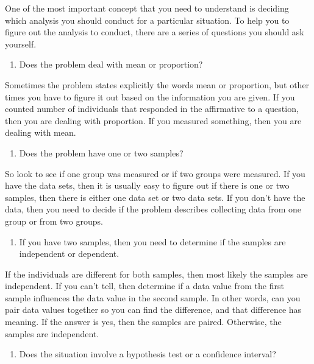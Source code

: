 \documentclass[]{book}
\providecommand{\tightlist}{%
  \setlength{\itemsep}{0pt}\setlength{\parskip}{0pt}}
\begin{document}
One of the most important concept that you need to understand is deciding which analysis you should conduct for a particular situation. To help you to figure out the analysis to conduct, there are a series of questions you should ask yourself.

\begin{enumerate}
\def\labelenumi{\arabic{enumi}.}
\tightlist
\item
  Does the problem deal with mean or proportion?
\end{enumerate}

Sometimes the problem states explicitly the words mean or proportion, but other times you have to figure it out based on the information you are given. If you counted number of individuals that responded in the affirmative to a question, then you are dealing with proportion. If you measured something, then you are dealing with mean.

\begin{enumerate}
\def\labelenumi{\arabic{enumi}.}
\setcounter{enumi}{1}
\tightlist
\item
  Does the problem have one or two samples?
\end{enumerate}

So look to see if one group was measured or if two groups were measured. If you have the data sets, then it is usually easy to figure out if there is one or two samples, then there is either one data set or two data sets. If you don't have the data, then you need to decide if the problem describes collecting data from one group or from two groups.

\begin{enumerate}
\def\labelenumi{\arabic{enumi}.}
\setcounter{enumi}{2}
\tightlist
\item
  If you have two samples, then you need to determine if the samples are independent or dependent.
\end{enumerate}

If the individuals are different for both samples, then most likely the samples are independent. If you can't tell, then determine if a data value from the first sample influences the data value in the second sample. In other words, can you pair data values together so you can find the difference, and that difference has meaning. If the answer is yes, then the samples are paired. Otherwise, the samples are independent.

\begin{enumerate}
\def\labelenumi{\arabic{enumi}.}
\setcounter{enumi}{3}
\tightlist
\item
  Does the situation involve a hypothesis test or a confidence interval?
\end{enumerate}
\end{document}
